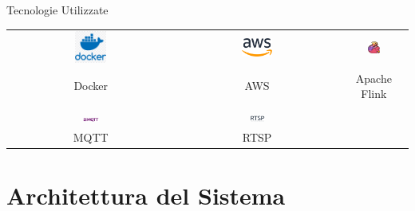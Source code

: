 \documentclass{beamer}
\begin{document}
\begin{frame}{Tecnologie Utilizzate}
    \centering
    \begin{tabular}{ccc}
        \includegraphics[width=0.2\textwidth]{images/docker_logo.png} & 
        \includegraphics[width=0.2\textwidth]{images/aws_logo.png} & 
        \includegraphics[width=0.2\textwidth]{images/apache_flink_logo.jpeg} \\
        Docker & AWS & Apache Flink \\
        \vspace{0.5cm} \\ %
        \includegraphics[width=0.1\textwidth]{images/mqtt_logo.png} & 
        \includegraphics[width=0.1\textwidth]{images/rtsp_logo.png} \\ 
        MQTT & RTSP \\
    \end{tabular}
\end{frame}


\section{Architettura del Sistema}
\end{document}
